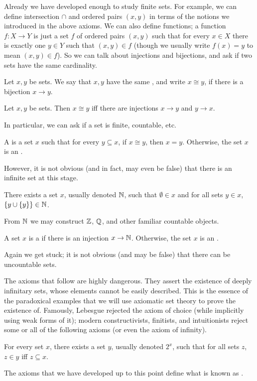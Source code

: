 Already we have developed enough to study finite sets.
For example, we can define intersection $\cap$ and ordered pairs $(x, y)$ in terms of the notions we introduced in the above axioms.
We can also define functions; a function $f: X \to Y$ is just a set $f$ of ordered pairs $(x, y)$ such that for every $x \in X$ there is exactly one $y \in Y$ such that $(x, y) \in f$ (though we usually write $f(x) = y$ to mean $(x, y) \in f$).
So we can talk about injections and bijections, and ask if two sets have the same cardinality.
\begin{definition}
Let $x, y$ be sets. We say that $x, y$ have the same , and write $x \cong y$, if there is a bijection $x \to y$.
\end{definition}
\begin{theorem}
Let $x, y$ be sets. Then $x \cong y$ iff there are injections $x \to y$ and $y \to x$.
\end{theorem}
In particular, we can ask if a set is finite, countable, etc.
\begin{definition}
A  is a set $x$ such that for every $y \subseteq x$, if $x \cong y$, then $x = y$.
Otherwise, the set $x$ is an .
\end{definition}
However, it is not obvious (and in fact, may even be false) that there is an infinite set at this stage.
\begin{axiom}[infinity]
There exists a set $x$, usually denoted $\mathbb{N}$, such that $\emptyset \in x$ and for all sets $y \in x$, $\{y \cup \{y\}\} \in \mathbb{N}$.
\end{axiom}
From $\mathbb{N}$ we may construct $\mathbb{Z}$, $\mathbb{Q}$, and other familiar countable objects.
\begin{definition}
A set $x$ is a  if there is an injection $x \to \mathbb{N}$.
Otherwise, the set $x$ is an .
\end{definition}
Again we get stuck; it is not obvious (and may be false) that there can be uncountable sets.

The axioms that follow are highly dangerous. They assert the existence of deeply infinitary sets, whose elements cannot be easily described.
This is the essence of the paradoxical examples that we will use axiomatic set theory to prove the existence of.
Famously, Lebesgue rejected the axiom of choice (while implicitly using weak forms of it); modern constructivists, finitists, and intuitionists reject some or all of the following axioms (or even the axiom of infinity).
\begin{axiom}
For every set $x$, there exists a set $y$, usually denoted $2^x$, such that for all sets $z$, $z \in y$ iff $z \subseteq x$.
\end{axiom}
The axioms that we have developed up to this point define what is known as .

